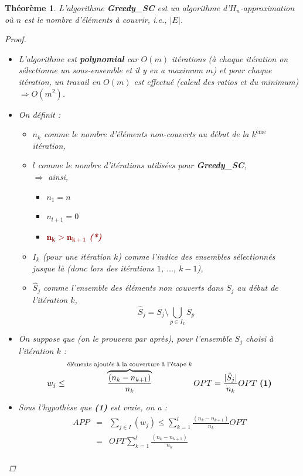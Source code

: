 \documentclass[12pt]{article}
\newcommand{\rouge}[1]{\textcolor{darkred}{#1}}
\newtheorem{thm}{Th\'eor\`eme}[section]
\newtheorem{proof}{Preuve}[section]
\begin{document}
\begin{thm}L'algorithme \textbf{Greedy\_SC} est un algorithme
d'$H_n$-approximation où $n$ est le nombre d'éléments à couvrir, i.e., $|E|$.
\begin{proof}$ $\\
\begin{itemize}
\item L'algorithme est \textbf{polynomial} car $O(m)$ itérations (à chaque
itération on sélectionne un sous-ensemble et il y en a maximum
$m$) et pour chaque itération, un travail en $O(m)$ est effectué (calcul des
ratios et du minimum) $\Rightarrow O(m^2)$.
\item On définit :
	\begin{itemize}
	\item[$\blacktriangle$] $n_k$ comme le nombre d'éléments non-couverts au
    début de la $k^{\text{ème}}$ itération,
	\item[$\blacktriangle$] $l$ comme le nombre d'itérations utilisées pour
    \textbf{Greedy\_SC},\\
	$\Rightarrow$ ainsi,
		\begin{itemize}
		\item[$\vartriangle$] $n_1 = n$
		\item[$\vartriangle$] $n_{l+1} = 0$
		\item[\rouge{$\blacktriangle$}] \rouge{$\mathbf{n_k > n_{k+1}}$
        \textbf{(*)}}
		\end{itemize}
	\item[$\blacktriangle$] $I_k$ (pour une itération $k$) comme l'indice des
    ensembles sélectionnés jusque là (donc lors des itérations
	$1$, $\ldots$, $k-1$),
	\item[$\blacktriangle$] $\hat{S}_j$ comme l'ensemble des éléments non
    couverts dans $S_j$ au début de l'itération $k$,
	$$\hat{S}_j = S_j \setminus \bigcup_{p\in I_k}{S_p}$$
	\end{itemize}
\item On suppose que (on le prouvera par après), pour l'ensemble $S_j$ choisi à
l'itération $k$ :
$$ w_j \leq \overbrace{\frac{(n_k - n_{k+1})}{n_k}}^{\text{\scriptsize éléments ajoutés à la couverture à l'étape $k$}} OPT = \frac{|\hat{S}_j|}{n_k}OPT\
\text{\textbf{(1)}}$$
\item Sous l'hypothèse que \textbf{(1)} est vraie, on a :
$$ \begin{eqnarray}
APP & = & \sum_{j\in I}(w_j) \leq \sum_{k=1}^l \frac{(n_k -n_{k+1})}{n_k}OPT\\
	& = & OPT \sum_{k=1}^l \frac{(n_k -n_{k+1})}{n_k}\\

\end{eqnarray}$$
\end{itemize}
\end{proof}
\end{thm}
\end{document}
